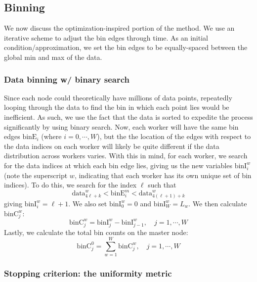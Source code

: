 \documentclass{article}
\begin{document}
\subsection{Binning}
We now discuss the optimization-inspired portion of the method. We use an iterative scheme to adjust the bin edges through time. As an initial condition/approximation, we  set the bin edges to be equally-spaced between the global min and max of the data.

\subsubsection{Data binning w/ binary search}
Since each node could theoretically have millions of data points, repeatedly looping through the data to find the bin in which each point lies would be inefficient. As such, we use the fact that the data is sorted to expedite the process significantly by using binary search. Now, each worker will have the same bin edges $\textrm{binE}_i$ (where $i = 0, \cdots, W$), but the the location of the edges with respect to the data indices on each worker will likely be quite different if the data distribution across workers varies. With this in mind, for each worker, we search for the data indices at which each bin edge lies, giving us the new variables $\textrm{binI}^w_i$ (note the superscript $w$, indicating that each worker has its own unique set of bin indices). To do this, we search for the index $\ell$ such that
\begin{equation}
	\textrm{data}^w_{4\ell+k} < \textrm{binE}^m_i < \textrm{data}^w_{{4(\ell+1)+k}}
\end{equation}
giving $\textrm{binI}^w_i = \ell+1$. We also set $\textrm{binI}^w_0 = 0$ and $\textrm{binI}^w_W = L_w$. We then calculate $\textrm{binC}^w_j$:
\begin{equation}
	\textrm{binC}^w_j = \textrm{binI}^w_j - \textrm{binI}^w_{j-1}, \quad j = 1, \cdots, W
\end{equation}
Lastly, we calculate the total bin counts on the master node:
\begin{equation}
	\textrm{binC}^0_j = \sum_{w=1}^{W} \textrm{binC}^w_j, \quad j = 1, \cdots, W
\end{equation}


\subsubsection{Stopping criterion: the uniformity metric}
\end{document}
